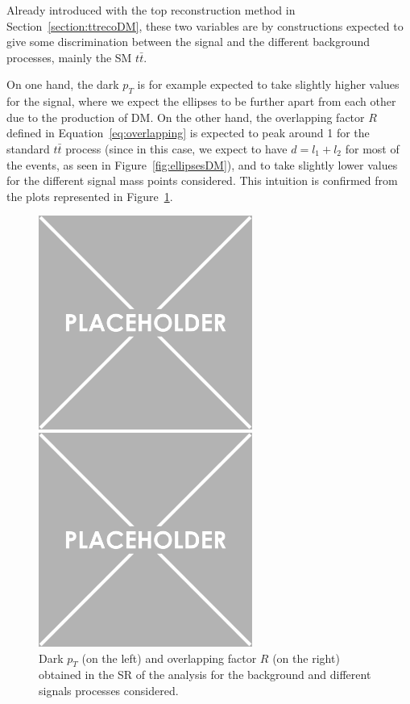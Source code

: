 \documentclass[a4paper, 10pt, openright]{report}
\begin{document}
Already introduced with the top reconstruction method in Section~\ref{section:ttrecoDM}, these two variables are by constructions expected to give some discrimination between the signal and the different background processes, mainly the \ac{SM} $t \bar t$. 

On one hand, the dark $p_T$ is for example expected to take slightly higher values for the signal, where we expect the ellipses to be further apart from each other due to the production of \ac{DM}. On the other hand, the overlapping factor $R$ defined in Equation~\ref{eq:overlapping} is expected to peak around 1 for the standard $t \bar t$ process (since in this case, we expect to have $d = l_1 + l_2$ for most of the events, as seen in Figure~\ref{fig:ellipsesDM}), and to take slightly lower values for the different signal mass points considered. This intuition is confirmed from the plots represented in Figure~\ref{fig:SRdisc1}.

\begin{figure}[htbp]
\centering
\begin{minipage}[b]{.48\textwidth}
\includegraphics[width=7cm, height=7cm]{figs/placeholder.png}
\end{minipage}\hfill
\begin{minipage}[b]{.48\textwidth}
\includegraphics[width=7cm, height=7cm]{figs/placeholder.png}
\end{minipage} \hfill
\caption{Dark $p_T$ (on the left) and overlapping factor $R$ (on the right) obtained in the \ac{SR} of the analysis for the background and different signals processes considered.}
\label{fig:SRdisc1}
\end{figure}
\end{document}
